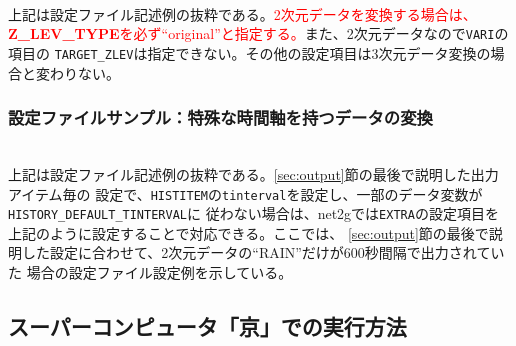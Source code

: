 \\

\noindent 上記は設定ファイル記述例の抜粋である。\textcolor{red}{2次元データを変換する場合は、
{\bf Z\_LEV\_TYPE}を必ず``original''と指定する。}また、2次元データなので\verb|VARI|の項目の
\verb|TARGET_ZLEV|は指定できない。その他の設定項目は3次元データ変換の場合と変わりない。


\subsubsection{設定ファイルサンプル：特殊な時間軸を持つデータの変換}

\\

\noindent 上記は設定ファイル記述例の抜粋である。\ref{sec:output}節の最後で説明した出力アイテム毎の
設定で、\verb|HISTITEM|の\verb|tinterval|を設定し、一部のデータ変数が\verb|HISTORY_DEFAULT_TINTERVAL|に
従わない場合は、net2gでは\verb|EXTRA|の設定項目を上記のように設定することで対応できる。ここでは、
\ref{sec:output}節の最後で説明した設定に合わせて、2次元データの``RAIN''だけが600秒間隔で出力されていた
場合の設定ファイル設定例を示している。


\subsection{スーパーコンピュータ「京」での実行方法}

